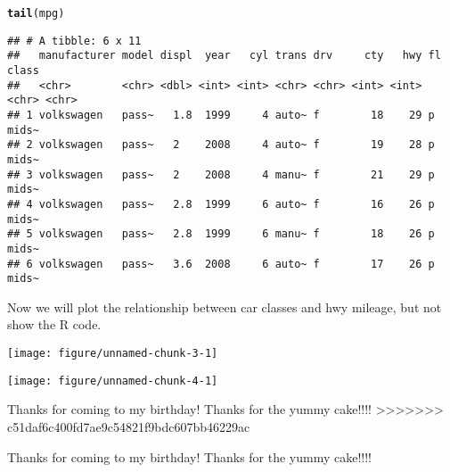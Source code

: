\documentclass{article}
\makeatletter
\def\maxwidth{ %
  \ifdim\Gin@nat@width>\linewidth
    \linewidth
  \else
    \Gin@nat@width
  \fi
}
\newcommand{\hlstd}[1]{\textcolor[rgb]{0.345,0.345,0.345}{#1}}%
\newcommand{\hlkwd}[1]{\textcolor[rgb]{0.737,0.353,0.396}{\textbf{#1}}}%
\newenvironment{kframe}{%
 \def\at@end@of@kframe{}%
 \ifinner\ifhmode%
  \def\at@end@of@kframe{\end{minipage}}%
  \begin{minipage}{\columnwidth}%
 \fi\fi%
 \def\FrameCommand##1{\hskip\@totalleftmargin \hskip-\fboxsep
 \colorbox{shadecolor}{##1}\hskip-\fboxsep
     \hskip-\linewidth \hskip-\@totalleftmargin \hskip\columnwidth}%
 \MakeFramed {\advance\hsize-\width
   \@totalleftmargin\z@ \linewidth\hsize
   \@setminipage}}%
 {\par\unskip\endMakeFramed%
 \at@end@of@kframe}
\newenvironment{knitrout}{}{} %
\makeatother
\begin{document}
\begin{knitrout}
\color{fgcolor}\begin{kframe}
\begin{alltt}
\hlkwd{tail}\hlstd{(mpg)}
\end{alltt}
\begin{verbatim}
## # A tibble: 6 x 11
##   manufacturer model displ  year   cyl trans drv     cty   hwy fl    class
##   <chr>        <chr> <dbl> <int> <int> <chr> <chr> <int> <int> <chr> <chr>
## 1 volkswagen   pass~   1.8  1999     4 auto~ f        18    29 p     mids~
## 2 volkswagen   pass~   2    2008     4 auto~ f        19    28 p     mids~
## 3 volkswagen   pass~   2    2008     4 manu~ f        21    29 p     mids~
## 4 volkswagen   pass~   2.8  1999     6 auto~ f        16    26 p     mids~
## 5 volkswagen   pass~   2.8  1999     6 manu~ f        18    26 p     mids~
## 6 volkswagen   pass~   3.6  2008     6 auto~ f        17    26 p     mids~
\end{verbatim}
\end{kframe}
\end{knitrout}

Now we will plot the relationship between car classes and hwy mileage, but not show the R code.

\begin{knitrout}
\color{fgcolor}
\texttt{[image: figure/unnamed-chunk-3-1]} 

\end{knitrout}

\begin{knitrout}
\color{fgcolor}\begin{kframe}


{\ttfamily\noindent\itshape{}}\end{kframe}
\texttt{[image: figure/unnamed-chunk-4-1]} 

\end{knitrout}

Thanks for coming to my birthday!
Thanks for the yummy cake!!!!
>>>>>>> c51daf6c400fd7ae9c54821f9bdc607bb46229ac

Thanks for coming to my birthday!
Thanks for the yummy cake!!!!
\end{document}
